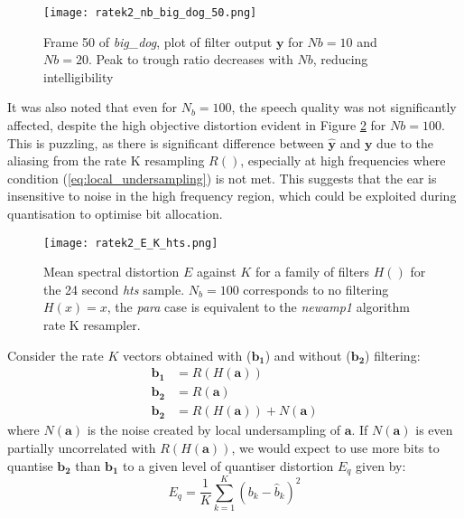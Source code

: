 \documentclass{article}
\begin{document}
\begin{figure}[h]
\caption{Frame 50 of \emph{big\_dog}, plot of filter output $\mathbf{y}$ for $Nb=10$ and $Nb=20$.  Peak to trough ratio decreases with $Nb$, reducing intelligibility}
\label{fig:ratek2_nb_big_dog_50}
\begin{center}
\texttt{[image: ratek2\_nb\_big\_dog\_50.png]}
\end{center}
\end{figure}

It was also noted that even for $N_b=100$, the speech quality was not significantly affected, despite the high objective distortion evident in Figure \ref{fig:ratek2_E_K_hts} for $Nb=100$.  This is puzzling, as there is significant difference between $\hat{\mathbf{y}}$ and $\mathbf{y}$ due to the aliasing from the rate K resampling $R()$, especially at high frequencies where condition (\ref{eq:local_undersampling}) is not met.  This suggests that the ear is insensitive to noise in the high frequency region, which could be exploited during quantisation to optimise bit allocation.

\begin{figure}[h]
\caption{Mean spectral distortion $E$ against $K$ for a family of filters $H()$ for the 24 second \emph{hts} sample. $N_b=100$ corresponds to no filtering $H(x)=x$, the \emph{para} case is equivalent to the \emph{newamp1} algorithm rate K resampler.}
\label{fig:ratek2_E_K_hts}
\begin{center}
\texttt{[image: ratek2\_E\_K\_hts.png]}
\end{center}
\end{figure}

Consider the rate $K$ vectors obtained with ($\mathbf{b_1}$) and without ($\mathbf{b_2}$) filtering:
\begin{equation}
\begin{split}
\mathbf{b_1} &= R(H(\mathbf{a})) \\
\mathbf{b_2} &= R(\mathbf{a}) \\
\mathbf{b_2} &= R(H(\mathbf{a})) + N(\mathbf{a})
\end{split}
\end{equation}
where $N(\mathbf{a})$ is the noise created by local undersampling of $\mathbf{a}$.  If $N(\mathbf{a})$ is even partially uncorrelated with $R(H(\mathbf{a}))$, we would expect to use more bits to quantise $\mathbf{b_2}$ than $\mathbf{b_1}$ to a given level of quantiser distortion $E_q$ given by:
\begin{equation}
E_q =\frac{1}{K}\sum_{k=1}^{K}(b_k-\hat{b}_k)^2 
\end{equation}
\end{document}
